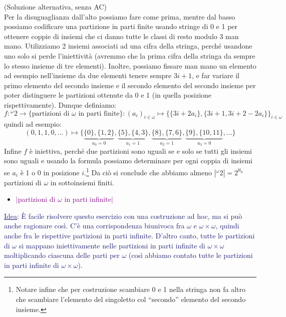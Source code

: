 \begin{soln}
	(Soluzione alternativa, senza AC)\\
	Per la disuguaglianza dall'alto possiamo fare come prima, mentre dal basso possiamo codificare una partizione in parti finite usando stringe di 0 e 1 per ottenere coppie di insiemi che ci danno tutte le classi di resto modulo 3 man mano.
	Utilizziamo 2 insiemi associati ad una cifra della stringa, perché usandone uno solo si perde l'iniettività (avremmo che la prima cifra della stringa da sempre lo stesso insieme di tre elementi). Inoltre, possiamo fissare man mano un elemento ad esempio nell'insieme da due elementi tenere sempre $3i+1$,
	e far variare il primo elemento del secondo insieme e il secondo elemento del secondo insieme per poter distinguere le partizioni ottenute da 0 e 1 (in quella posizione rispettivamente). Dunque definiamo:
	\[ f : {}^\omega2 \to \{\text{partizioni di $\omega$ in parti finite}\} : (a_i)_{i \in \omega} \mapsto \{\{3i + 2a_i\},\{3i+1,3i+2-2a_i\}\}_{i \in \omega}
		\]
	quindi ad esempio:
	\[ (0,1,1,0,\ldots) \mapsto \{\underbrace{\{0\},\{1,2\}}_{a_0 = 0},\underbrace{\{5\},\{4,3\}}_{a_1 = 1},\underbrace{\{8\},\{7,6\}}_{a_2 = 1},\underbrace{\{9\},\{10,11\}}_{a_3 = 0},\ldots\}
		\]
	Infine $f$ è iniettiva, perché due partizioni sono uguali se e solo se tutti gli insiemi sono uguali e usando la formula possiamo determinare per ogni coppia di insiemi se $a_i$ è 1 o 0 in posizione $i$.\footnote{Notare infine che per costruzione scambiare 0 e 1 nella stringa non fa altro che scambiare l'elemento del singoletto col ``secondo'' elemento del secondo insieme.}
	Da ciò si conclude che abbiamo almeno $|{}^\omega2| = 2^{\aleph_0}$ partizioni di $\omega$ in sottoinsiemi finiti.
\end{soln}

\begin{itemize}
	\item \textcolor{purple}{$|$partizioni di $\omega$ in parti infinite$|$}
\end{itemize}

\textcolor{MidnightBlue}{\underline{Idea}: È facile risolvere questo esercizio con una costruzione ad hoc, ma si può anche ragionare così. C'è una corrispondenza biunivoca fra $\omega$ e $\omega \times \omega$, quindi anche fra le rispettive partizioni in parti infinite.
D'altro canto, tutte le partizioni di $\omega$ si mappano iniettivamente nelle partizioni in parti infinite di $\omega \times \omega$ moltiplicando ciascuna delle parti per $\omega$ (così abbiamo contato tutte le partizioni in parti infinite di $\omega \times \omega$).}

